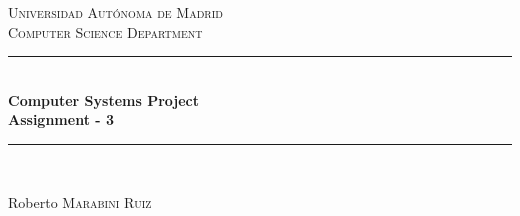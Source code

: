 \documentclass[12pt]{article} %
\begin{document}

\begin{titlepage}

\newcommand{\HRule}{\rule{\linewidth}{0.5mm}} %

\center %

\textsc{\LARGE Universidad Aut\'{o}noma de Madrid}\\[1.5cm] %
\textsc{\Large Computer Science Department}\\[0.5cm] %

\HRule \\[0.4cm]
{ \huge \bfseries Computer Systems Project\\[0.5cm] Assignment - 3}\\[0.4cm] %
\HRule \\[1.5cm]





\vfill %
\begin{flushright}
 \large
Roberto  \textsc{Marabini Ruiz} %
\end{flushright}

\end{titlepage}
\end{document}
